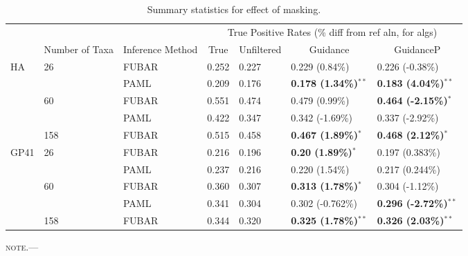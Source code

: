 \documentclass[11pt]{article}
\begin{document}

\begin{table}[htbp]
\begin{adjustwidth}{-1.75cm}{}
\caption {\label{tab:summarystats} Summary statistics for effect of masking.}
\begin{tabular}{l l l l l l l}
\hline\noalign{\smallskip}
& & & \multicolumn{4}{c}{True Positive Rates (\% diff from ref aln, for algs)} \\
\cline{4-7}\noalign{\smallskip}
\multicolumn{1}{c}{Selective Profile} & \multicolumn{1}{c}{Number of Taxa} & \multicolumn{1}{c}{Inference Method} & \multicolumn{1}{c}{True} & \multicolumn{1}{c}{Unfiltered} & \multicolumn{1}{c}{Guidance} & \multicolumn{1}{c}{GuidanceP} \\
\noalign{\smallskip}\hline\noalign{\smallskip}
HA & 26 & FUBAR & 0.252 & 0.227 & 0.229 (0.84\%) & 0.226 (-0.38\%) \\
 &   & PAML & 0.209 & 0.176 & \textbf{0.178 (1.34\%)}$^{\ast\ast}$ & \textbf{0.183 (4.04\%)}$^{\ast\ast}$ \\
\hline
 & 60 & FUBAR & 0.551 & 0.474 & 0.479 (0.99\%) & \textbf{0.464 (-2.15\%)}$^{\ast}$  \\
 &  & PAML & 0.422 & 0.347 & 0.342 (-1.69\%) & 0.337 (-2.92\%) \\
 \hline
 & 158 & FUBAR & 0.515 & 0.458 & \textbf{0.467 (1.89\%)}$^{\ast}$ & \textbf{0.468 (2.12\%)}$^{\ast}$ \\
\hline
GP41 & 26 & FUBAR & 0.216 & 0.196 & \textbf{0.20 (1.89\%)}$^{\ast}$ & 0.197 (0.383\%) \\
 & & PAML & 0.237 & 0.216 & 0.220 (1.54\%) & 0.217 (0.244\%) \\
 \hline
 & 60 & FUBAR & 0.360 & 0.307 & \textbf{0.313 (1.78\%)}$^{\ast}$ & 0.304 (-1.12\%)\\
 & & PAML & 0.341 & 0.304 & 0.302 (-0.762\%) & \textbf{0.296 (-2.72\%)}$^{\ast\ast}$ \\
 \hline
 & 158 & FUBAR & 0.344 & 0.320 & \textbf{0.325 (1.78\%)}$^{\ast\ast}$ & \textbf{0.326 (2.03\%)}$^{\ast\ast}$ \\
\hline
\end{tabular}
\newline
\textsc{note.}--- %
\end{adjustwidth}
\end{table}
\end{document}
